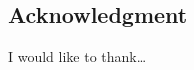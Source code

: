 
\begin{center}
    \begin{minipage}{2\textwidth/3}
        \chapter{Acknowledgment}

        I would like to thank\dots
    \end{minipage}
\end{center}
